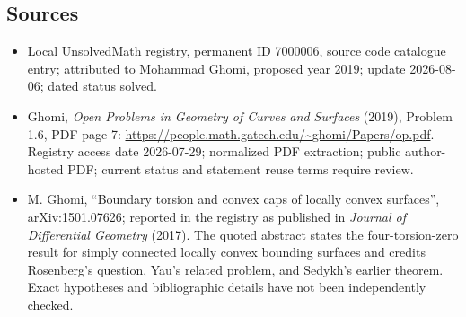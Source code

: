 \documentclass[11pt]{article}
\begin{document}
\subsection{Sources}
\begin{itemize}
\item Local UnsolvedMath registry, permanent ID 7000006, source code catalogue entry; attributed to Mohammad Ghomi, proposed year 2019; update 2026-08-06; dated status solved.
\item Ghomi, \emph{Open Problems in Geometry of Curves and Surfaces} (2019), Problem 1.6, PDF page 7: \url{https://people.math.gatech.edu/~ghomi/Papers/op.pdf}. Registry access date 2026-07-29; normalized PDF extraction; public author-hosted PDF; current status and statement reuse terms require review.
\item M. Ghomi, ``Boundary torsion and convex caps of locally convex surfaces'', arXiv:1501.07626; reported in the registry as published in \emph{Journal of Differential Geometry} (2017). The quoted abstract states the four-torsion-zero result for simply connected locally convex bounding surfaces and credits Rosenberg's question, Yau's related problem, and Sedykh's earlier theorem. Exact hypotheses and bibliographic details have not been independently checked.
\end{itemize}
\end{document}
